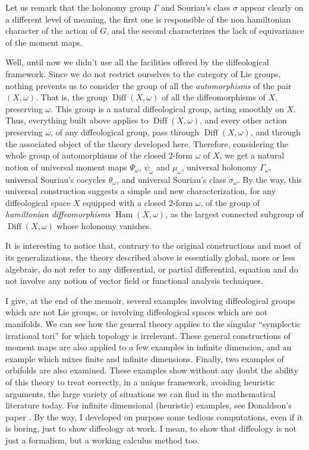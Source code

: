 \documentclass[10pt,reqno,twoside]{amsart}
\DeclareMathOperator{\Diff}{Diff}
\DeclareMathOperator{\Ham}{Ham}
\theoremstyle{plain}
\theoremstyle{definition}
\begin{document}
  Let us remark that the holonomy group $\Gamma$ and Souriau's class $\sigma$ appear clearly on a different level of meaning,
  the first one is responsible of the non hamiltonian character of the action of $G$,
  and the second characterizes the lack of equivariance of the moment maps.
  
  Well,
  until now we didn't use all the facilities offered by the diffeological framework.
  Since we do not restrict ourselves to the category of Lie groups,
  nothing prevents us to consider the group of all the {\em automorphisms} of the pair $(X,\omega)$.
  That is,
  the group $\Diff(X,\omega)$ of all the diffeomorphisms of $X$,
  preserving $\omega$.
  This group is a natural diffeological group,
  acting smoothly on $X$.
  Thus,
  everything built above applies to $\Diff(X,\omega)$,
  and every other action preserving $\omega$,
  of any diffeological group,
  pass through $\Diff(X,\omega)$,
  and through the associated object of the theory developed here.
  Therefore,
  considering the whole group of automorphisms of the closed 2-form $\omega$ of $X$,
  we get a natural notion of universal moment maps $\Psi_\omega$, $\psi_\omega$ and $\mu_\omega$,
  universal holonomy $\Gamma_\omega$,
  universal Souriau's cocycles $\theta_\omega$,
  and universal Souriau's class $\sigma_\omega$.
  By the way,
  this universal construction suggests a simple and new characterization,
  for any diffeological space $X$ equipped with a closed 2-form $\omega$,
  of the group of {\em hamiltonian diffeomorphisms} $\Ham(X,\omega)$,
  as the largest connected subgroup of $\Diff(X,\omega)$ whose holonomy vanishes.
  
  It is interesting to notice that,
  contrary to the original constructions \cite{Sou70} and most of its generalizations,
  the theory described above is essentially global,
  more or less algebraic,
  do not refer to any differential,
  or partial differential,
  equation and do not involve any notion of vector field or functional analysis techniques.
  
  I give,
  at the end of the memoir,
  several examples involving diffeological groups which are not Lie groups,
  or involving diffeological spaces which are not manifolds.
  We can see how the general theory applies to the singular ``symplectic irrational tori'' for which topology is irrelevant.
  These general constructions of moment maps are also applied to a few examples in infinite dimension,
  and an example which mixes finite and infinite dimensions.
  Finally,
  two examples of orbifolds are also examined.
  These examples show without any doubt the ability of this theory to treat correctly,
  in a unique framework,
  avoiding heuristic arguments,
  the large variety of situations we can find in the mathematical literature today.
  For infinite dimensional (heuristic) examples,
  see Donaldson's paper \cite{Dnl99}.
  By the way,
  I developed on purpose some tedious computations,
  even if it is boring,
  just to show diffeology at work.
  I mean,
  to show that diffeology is not just a formalism,
  but a working calculus method too.
  
\end{document}
